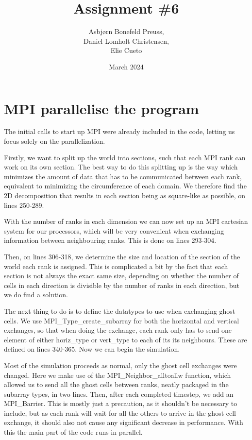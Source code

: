 \documentclass{article}
\title{Assignment \#6}
\author{Asbjørn Bonefeld Preuss,\\ Daniel Lomholt Christensen,\\ Elie Cueto}
\date{March 2024}
\begin{document}
\maketitle
\section{MPI parallelise the program}
The initial calls to start up MPI were already included in the code, letting us focus solely on the parallelization. 

Firstly, we want to split up the world into sections, such that each MPI rank can work on its own section. The best way to do this splitting up is the way which minimizes the amount of data that has to be communicated between each rank, equivalent to minimizing the circumference of each domain. We therefore find the 2D decomposition that results in each section being as square-like as possible, on lines 250-289.

With the number of ranks in each dimension we can now set up an MPI cartesian system for our processors, which will be very convenient when exchanging information between neighbouring ranks. This is done on lines 293-304. 

Then, on lines 306-318, we determine the size and location of the section of the world each rank is assigned. This is complicated a bit by the fact that each section is not always the exact same size, depending on whether the number of cells in each direction is divisible by the number of ranks in each direction, but we do find a solution.

The next thing to do is to define the datatypes to use when exchanging ghost cells. We use MPI\_Type\_create\_subarray for both the horizontal and vertical exchanges, so that when doing the exchange, each rank only has to send one element of either horiz\_type or vert\_type to each of its its neighbours. These are defined on lines 340-365. Now we can begin the simulation.

Most of the simulation proceeds as normal, only the ghost cell exchanges were changed. Here we make use of the MPI\_Neighbor\_alltoallw function, which allowed us to send all the ghost cells between ranks, neatly packaged in the subarray types, in two lines. Then, after each completed timestep, we add an MPI\_Barrier.  This is mostly just a precaution, as it shouldn't be necessary to include, but as each rank will wait for all the others to arrive in the ghost cell exchange, it should also not cause any significant decrease in performance. With this the main part of the code runs in parallel. 
\end{document}
